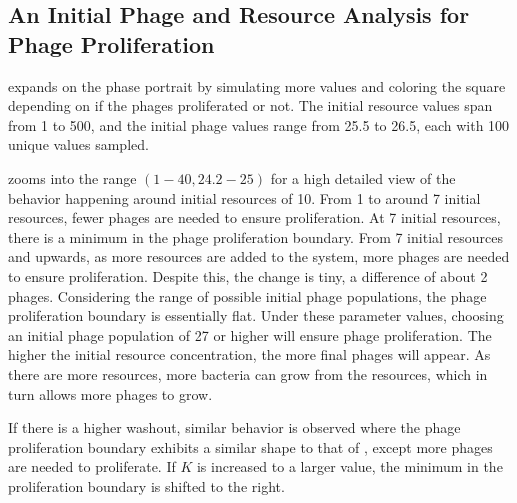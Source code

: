 \subsection{An Initial Phage and Resource Analysis for Phage Proliferation}
 expands on the phase portrait by simulating more values and coloring the square depending on if the phages proliferated or not. 
The initial resource values span from 1 to 500, and the initial phage values range from 25.5 to 26.5, each with 100 unique values sampled.

 zooms into the range $(1-40, 24.2-25)$ for a high detailed view of the behavior happening around initial resources of 10. 
From 1 to around 7 initial resources, fewer phages are needed to ensure proliferation. 
At 7 initial resources, there is a minimum in the phage proliferation boundary. 
From 7 initial resources and upwards, as more resources are added to the system, more phages are needed to ensure proliferation. 
Despite this, the change is tiny, a difference of about 2 phages. 
Considering the range of possible initial phage populations, the phage proliferation boundary is essentially flat. 
Under these parameter values, choosing an initial phage population of 27 or higher will ensure phage proliferation. 
The higher the initial resource concentration, the more final phages will appear. 
As there are more resources, more bacteria can grow from the resources, which in turn allows more phages to grow. 

If there is a higher washout, similar behavior is observed where the phage proliferation boundary exhibits a similar shape to that of , except more phages are needed to proliferate. 
If $K$ is increased to a larger value, the minimum in the proliferation boundary is shifted to the right. 


